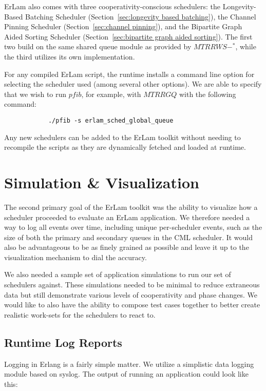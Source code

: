ErLam also comes with three cooperativity-conscious schedulers: the 
Longevity-Based Batching Scheduler (Section~\ref{sec:longevity based batching}),
the Channel Pinning Scheduler (Section~\ref{sec:channel pinning}), and the
Bipartite Graph Aided Sorting Scheduler (Section~\ref{sec:bipartite graph aided sorting}).
The first two build on the same shared queue module as provided by $MTRRWS-^{*}$, 
while the third utilizes its own implementation.

For any compiled ErLam script, the runtime installs a command line option for
selecting the scheduler used (among several other options). We are able to 
specify that we wish to run $pfib$, for example, with $MTRRGQ$ with
the following command:
\begin{verbatim}
            ./pfib -s erlam_sched_global_queue 
\end{verbatim}
\noindent
Any new schedulers can be added to the ErLam toolkit without needing to 
recompile the scripts as they are dynamically fetched and loaded at runtime. 

\section{Simulation \& Visualization}\label{sec:simulation and visualization}

The second primary goal of the ErLam toolkit was the ability to visualize 
how a scheduler proceeded to evaluate an ErLam application. We therefore needed
a way to log all events over time, including unique per-scheduler events, such 
as the size of both the primary and secondary queues in the CML scheduler. It 
would also be advantageous to be as finely grained as possible and leave it up to 
the visualization mechanism to dial the accuracy.

We also needed a sample set of application simulations to run our set of 
schedulers against. These simulations needed to be minimal to reduce
extraneous data but still demonstrate various levels of cooperativity and phase 
changes. We would like to also have the ability to compose test cases 
together to better create realistic work-sets for the schedulers to react to.

\subsection{Runtime Log Reports}\label{sec:runtime log reports}

Logging in Erlang is a fairly simple matter. We utilize a simplistic data 
logging module based on syslog. The output of running an application 
could look like this:

